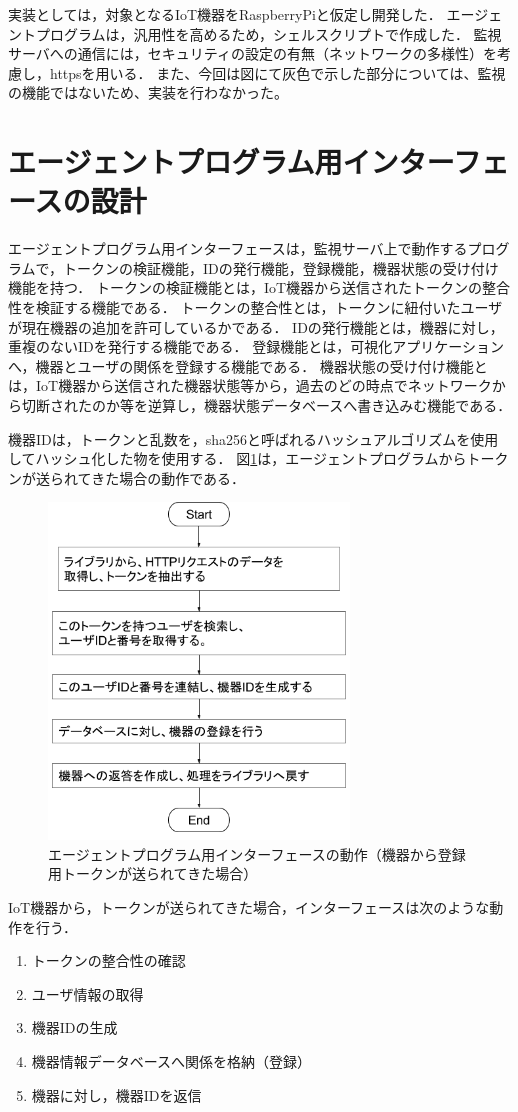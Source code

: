 実装としては，対象となるIoT機器をRaspberryPiと仮定し開発した．
エージェントプログラムは，汎用性を高めるため，シェルスクリプトで作成した．
監視サーバへの通信には，セキュリティの設定の有無（ネットワークの多様性）を考慮し，httpsを用いる．
また、今回は図にて灰色で示した部分については、監視の機能ではないため、実装を行わなかった。


\section{エージェントプログラム用インターフェースの設計}
エージェントプログラム用インターフェースは，監視サーバ上で動作するプログラムで，トークンの検証機能，IDの発行機能，登録機能，機器状態の受け付け機能を持つ．
トークンの検証機能とは，IoT機器から送信されたトークンの整合性を検証する機能である．
トークンの整合性とは，トークンに紐付いたユーザが現在機器の追加を許可しているかである．
IDの発行機能とは，機器に対し，重複のないIDを発行する機能である．
登録機能とは，可視化アプリケーションへ，機器とユーザの関係を登録する機能である．
機器状態の受け付け機能とは，IoT機器から送信された機器状態等から，過去のどの時点でネットワークから切断されたのか等を逆算し，機器状態データベースへ書き込みむ機能である．

機器IDは，トークンと乱数を，sha256と呼ばれるハッシュアルゴリズムを使用してハッシュ化した物を使用する．
図\ref{fig:interface_flowA}は，エージェントプログラムからトークンが送られてきた場合の動作である．
\begin{figure}[htbp]
\begin{center}
\includegraphics[width=8cm]{images/interface_flow.png}
\caption{エージェントプログラム用インターフェースの動作（機器から登録用トークンが送られてきた場合）}
\label{fig:interface_flowA}
\end{center}
\end{figure}
IoT機器から，トークンが送られてきた場合，インターフェースは次のような動作を行う．
\begin{enumerate}
\item トークンの整合性の確認
\item ユーザ情報の取得
\item 機器IDの生成
\item 機器情報データベースへ関係を格納（登録）
\item 機器に対し，機器IDを返信
\end{enumerate}

